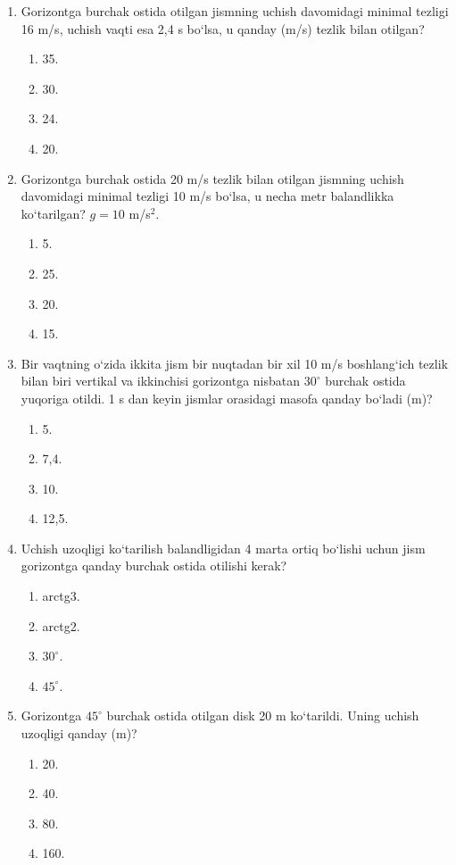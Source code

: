 \begin{enumerate}
\item Gorizontga burchak ostida otilgan jismning uchish davomidagi minimal tezligi 16 m/s, uchish vaqti esa 2,4 s bo‘lsa, u qanday (m/s) tezlik bilan otilgan?
\begin{enumerate}[label=\Alph*)]
\item 35.
\item 30.
\item 24.
\item 20.
\end{enumerate}

\item Gorizontga burchak ostida 20 m/s tezlik bilan otilgan jismning uchish davomidagi minimal tezligi 10 m/s bo‘lsa, u necha metr balandlikka ko‘tarilgan? $g=10$ m/s$^2$.
\begin{enumerate}[label=\Alph*)]
\item 5.
\item 25.
\item 20.
\item 15.
\end{enumerate}

\item Bir vaqtning o‘zida ikkita jism bir nuqtadan bir xil 10 m/s boshlang‘ich tezlik bilan biri vertikal va ikkinchisi gorizontga nisbatan $30^\circ$ burchak ostida yuqoriga otildi. 1 s dan keyin jismlar orasidagi masofa qanday bo‘ladi (m)?
\begin{enumerate}[label=\Alph*)]
\item 5.
\item 7,4.
\item 10.
\item 12,5.
\end{enumerate}



\item Uchish uzoqligi ko‘tarilish balandligidan 4 marta ortiq bo‘lishi uchun jism gorizontga qanday burchak ostida otilishi kerak?
\begin{enumerate}[label=\Alph*)]
\item arctg3.
\item arctg2.
\item $30^\circ$.
\item $45^\circ$.
\end{enumerate}

\item Gorizontga $45^\circ$ burchak ostida otilgan disk 20 m ko‘tarildi. Uning uchish uzoqligi qanday (m)?
\begin{enumerate}[label=\Alph*)]
\item 20.
\item 40.
\item 80.
\item 160.
\end{enumerate}


\end{enumerate}
